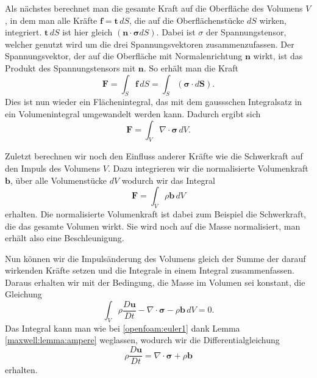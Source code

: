 Als nächstes berechnet man die gesamte Kraft auf die Oberfläche des
Volumens $V$, in dem man alle Kräfte $\mathbf{f} = \mathbf{t}\,dS$,
die auf die Oberflächenstücke $dS$ wirken, integriert.
$\mathbf{t}\, dS$ ist hier gleich $(\mathbf{n\cdot\sigma}dS)$.
Dabei ist $\sigma$ der Spannungstensor, welcher genutzt wird um die drei Spannungsvektoren zusammenzufassen.
%
Der Spannungsvektor, der auf die Oberfläche mit Normalenrichtung $\mathbf{n}$ wirkt, ist das Produkt des Spannungstensors mit $\mathbf{n}$.
So erhält man die Kraft 
\[\mathbf{F} 
=
\int_{S}\mathbf{f}\, dS
= \int_{S} (\mathbf{\sigma}\cdot d\mathbf{S})
.\]
Dies ist nun wieder ein Flächenintegral, das mit dem gaussschen Integralsatz in ein Volumenintegral umgewandelt werden kann.
%
%
Dadurch ergibt sich
\[\mathbf{F} 
=
\int_{V}\nabla \cdot \mathbf{\sigma}\, dV
.\]

Zuletzt berechnen wir noch den Einfluss anderer Kräfte wie die Schwerkraft auf den Impuls des Volumens $V$.
Dazu integrieren wir die normalisierte Volumenkraft $\mathbf{b}$, über alle Volumenstücke $dV$ wodurch wir das Integral 
\[\mathbf{F} 
=
\int_{V}\rho\mathbf{b}\, dV
\]
erhalten.
Die normalisierte Volumenkraft ist dabei zum Beispiel die Schwerkraft, die das gesamte Volumen wirkt. 
Sie wird noch auf die Masse normalisiert, man erhält also eine Beschleunigung.

Nun können wir die Impulsänderung des Volumens gleich der Summe der darauf wirkenden Kräfte setzen und die Integrale in einem Integral zusammenfassen. Daraus erhalten wir mit der Bedingung, die Masse im Volumen sei konstant, die Gleichung 
\[\int_{V} \rho \frac{D\mathbf{u}}{Dt} - \nabla \cdot \mathbf{\sigma} -\rho \mathbf{b}\, dV
=
0.
\]
Das Integral kann man wie bei \eqref{openfoam:euler1} dank Lemma \ref{maxwell:lemma:ampere} weglassen, wodurch wir die Differentialgleichung
\begin{equation}
\label{openfoam:euler2_1}
\rho \frac{D\mathbf{u}}{Dt}
= 
\nabla \cdot \mathbf{\sigma} +\rho \mathbf{b}
\end{equation}
erhalten.


